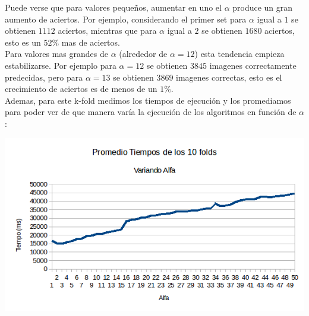 Puede verse que para valores pequeños, aumentar en uno el $\alpha$ produce un gran aumento de aciertos. Por ejemplo, considerando el primer set para $\alpha$ igual a $1$ se obtienen $1112$ aciertos, mientras que para $\alpha$ igual a $2$ se obtienen $1680$ aciertos, esto es un $52\%$ mas de aciertos.
\\
Para valores mas grandes de $\alpha$ (alrededor de $\alpha = 12$) esta tendencia empieza estabilizarse. Por ejemplo para $\alpha = 12$ se obtienen $3845$ imagenes correctamente predecidas, pero para $\alpha = 13$ se obtienen $3869$ imagenes correctas, esto es el crecimiento de aciertos es de menos de un $1\%$.
\\
Ademas, para este k-fold medimos los tiempos de ejecución y los promediamos para poder ver de que manera varía la ejecución de los algoritmos en función de $\alpha$:

\begin{center}
\includegraphics[scale=0.6]{nuevosResultados/pca/alfa/temp.png}
\end{center}


